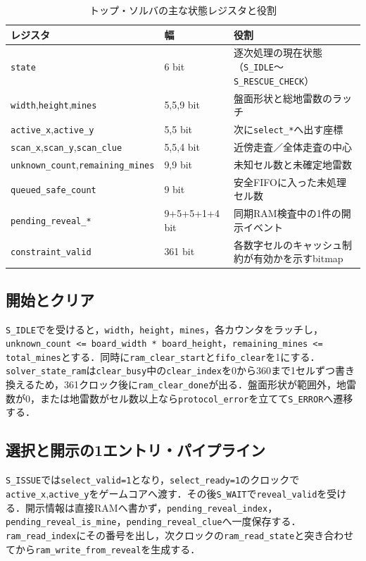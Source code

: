\begin{table}[tb]
\centering
\caption{トップ・ソルバの主な状態レジスタと役割}
\label{tab:solver-fsm-registers}
\begin{tabularx}{\linewidth}{llX}
\toprule
レジスタ & 幅 & 役割\\
\midrule
\texttt{state} & 6 bit & 逐次処理の現在状態（\texttt{S\_IDLE}〜\texttt{S\_RESCUE\_CHECK}）\\
\texttt{width},\texttt{height},\texttt{mines} & 5,5,9 bit & 盤面形状と総地雷数のラッチ\\
\texttt{active\_x},\texttt{active\_y} & 5,5 bit & 次に\texttt{select\_*}へ出す座標\\
\texttt{scan\_x},\texttt{scan\_y},\texttt{scan\_clue} & 5,5,4 bit & 近傍走査／全体走査の中心\\
\texttt{unknown\_count},\texttt{remaining\_mines} & 9,9 bit & 未知セル数と未確定地雷数\\
\texttt{queued\_safe\_count} & 9 bit & 安全FIFOに入った未処理セル数\\
\texttt{pending\_reveal\_*} & 9+5+5+1+4 bit & 同期RAM検査中の1件の開示イベント\\
\texttt{constraint\_valid} & 361 bit & 各数字セルのキャッシュ制約が有効かを示すbitmap\\
\bottomrule
\end{tabularx}
\end{table}

\subsection{開始とクリア}

\texttt{S\_IDLE}でを受けると，\texttt{width}，\texttt{height}，\texttt{mines}，各カウンタをラッチし，\texttt{unknown\_count <= board\_width * board\_height}，\texttt{remaining\_mines <= total\_mines}とする．同時に\texttt{ram\_clear\_start}と\texttt{fifo\_clear}を1にする．\texttt{solver\_state\_ram}は\texttt{clear\_busy}中の\texttt{clear\_index}を0から360まで1セルずつ書き換えるため，361クロック後に\texttt{ram\_clear\_done}が出る．盤面形状が範囲外，地雷数が0，または地雷数がセル数以上なら\texttt{protocol\_error}を立てて\texttt{S\_ERROR}へ遷移する．

\subsection{選択と開示の1エントリ・パイプライン}

\texttt{S\_ISSUE}では\texttt{select\_valid=1}となり，\texttt{select\_ready=1}のクロックで\texttt{active\_x},\texttt{active\_y}をゲームコアへ渡す．その後\texttt{S\_WAIT}で\texttt{reveal\_valid}を受ける．開示情報は直接RAMへ書かず，\texttt{pending\_reveal\_index}，\texttt{pending\_reveal\_is\_mine}，\texttt{pending\_reveal\_clue}へ一度保存する．\texttt{ram\_read\_index}にその番号を出し，次クロックの\texttt{ram\_read\_state}と突き合わせてから\texttt{ram\_write\_from\_reveal}を生成する．

